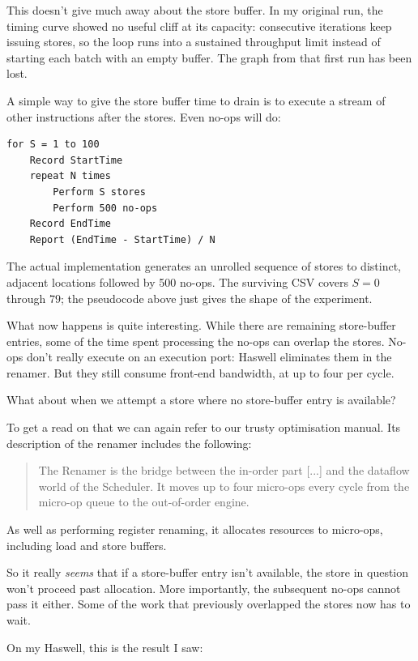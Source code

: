 \documentclass[11pt]{article}
\begin{document}
This doesn't give much away about the store buffer. In my original run, the timing curve showed no useful cliff at its capacity: consecutive iterations keep issuing stores, so the loop runs into a sustained throughput limit instead of starting each batch with an empty buffer. The graph from that first run has been lost.

A simple way to give the store buffer time to drain is to execute a stream of other instructions after the stores. Even no-ops will do:

\begin{verbatim}
for S = 1 to 100
    Record StartTime
    repeat N times
        Perform S stores
        Perform 500 no-ops
    Record EndTime
    Report (EndTime - StartTime) / N
\end{verbatim}

The actual implementation generates an unrolled sequence of stores to distinct, adjacent locations followed by 500 no-ops. The surviving CSV covers $S=0$ through $79$; the pseudocode above just gives the shape of the experiment.

What now happens is quite interesting. While there are remaining store-buffer entries, some of the time spent processing the no-ops can overlap the stores. No-ops don't really execute on an execution port: Haswell eliminates them in the renamer. But they still consume front-end bandwidth, at up to four per cycle.

What about when we attempt a store where no store-buffer entry is available?

To get a read on that we can again refer to our trusty optimisation manual. Its description of the renamer includes the following:

\begin{quote}
The Renamer is the bridge between the in-order part [...] and the dataflow world of the Scheduler. It moves up to four micro-ops every cycle from the micro-op queue to the out-of-order engine.
\end{quote}

As well as performing register renaming, it allocates resources to micro-ops, including load and store buffers.

So it really \emph{seems} that if a store-buffer entry isn't available, the store in question won't proceed past allocation. More importantly, the subsequent no-ops cannot pass it either. Some of the work that previously overlapped the stores now has to wait.

On my Haswell, this is the result I saw:
\end{document}
